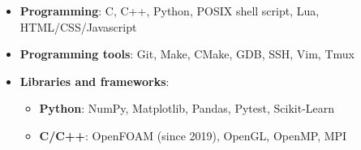 {
  \vspace{0.5em}
  \begin{itemize}
    \setlength\itemsep{0.5em}
    \shorthandoff{:}
    \item \textbf{Programming}: C, C++, Python, POSIX shell script, Lua, HTML/CSS/Javascript
    \item \textbf{Programming tools}: Git, Make, CMake, GDB, SSH, Vim, Tmux
    \item \textbf{Libraries and frameworks}:
      \vspace{0.5em}
      \begin{itemize}
        \setlength\itemsep{0.3em}
        \item \textbf{Python}: NumPy, Matplotlib, Pandas, Pytest, Scikit-Learn
        \item \textbf{C/C++}: OpenFOAM (since 2019), OpenGL, OpenMP, MPI
      \end{itemize}


\end{itemize}}
